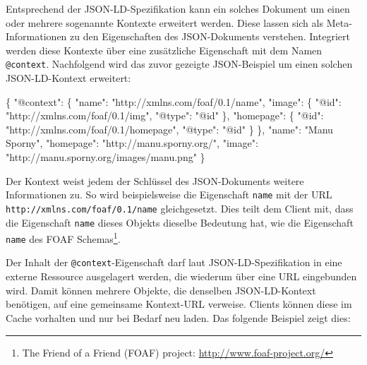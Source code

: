 \documentclass[,a4paper]{article}
\newenvironment{Shaded}{}{}
\newcommand{\DataTypeTok}[1]{\textcolor[rgb]{0.56,0.13,0.00}{{#1}}}
\newcommand{\StringTok}[1]{\textcolor[rgb]{0.25,0.44,0.63}{{#1}}}
\newcommand{\FunctionTok}[1]{\textcolor[rgb]{0.02,0.16,0.49}{{#1}}}
\begin{document}
Entsprechend der JSON-LD-Spezifikation kann ein solches Dokument um
einen oder mehrere sogenannte Kontexte erweitert werden. Diese lassen
sich als Meta-Informationen zu den Eigenschaften des JSON-Dokuments
verstehen. Integriert werden diese Kontexte über eine zusätzliche
Eigenschaft mit dem Namen \texttt{@context}. Nachfolgend wird das zuvor
gezeigte JSON-Beispiel um einen solchen JSON-LD-Kontext erweitert:

\begin{Shaded}
\begin{Highlighting}[]
\FunctionTok{\{}
  \DataTypeTok{"@context"}\FunctionTok{:}
  \FunctionTok{\{}
    \DataTypeTok{"name"}\FunctionTok{:} \StringTok{"http://xmlns.com/foaf/0.1/name"}\FunctionTok{,}
    \DataTypeTok{"image"}\FunctionTok{:} \FunctionTok{\{}
      \DataTypeTok{"@id"}\FunctionTok{:} \StringTok{"http://xmlns.com/foaf/0.1/img"}\FunctionTok{,}
      \DataTypeTok{"@type"}\FunctionTok{:} \StringTok{"@id"}
    \FunctionTok{\},}
    \DataTypeTok{"homepage"}\FunctionTok{:} \FunctionTok{\{}
      \DataTypeTok{"@id"}\FunctionTok{:} \StringTok{"http://xmlns.com/foaf/0.1/homepage"}\FunctionTok{,}
      \DataTypeTok{"@type"}\FunctionTok{:} \StringTok{"@id"}
    \FunctionTok{\}}
  \FunctionTok{\},}
  \DataTypeTok{"name"}\FunctionTok{:} \StringTok{"Manu Sporny"}\FunctionTok{,}
  \DataTypeTok{"homepage"}\FunctionTok{:} \StringTok{"http://manu.sporny.org/"}\FunctionTok{,}
  \DataTypeTok{"image"}\FunctionTok{:} \StringTok{"http://manu.sporny.org/images/manu.png"}
\FunctionTok{\}}
\end{Highlighting}
\end{Shaded}

Der Kontext weist jedem der Schlüssel des JSON-Dokuments weitere
Informationen zu. So wird beispielsweise die Eigenschaft \texttt{name}
mit der URL \texttt{http://xmlns.com/foaf/0.1/name} gleichgesetzt. Dies
teilt dem Client mit, dass die Eigenschaft \texttt{name} dieses Objekts
dieselbe Bedeutung hat, wie die Eigenschaft \texttt{name} des FOAF
Schemas\footnote{The Friend of a Friend (FOAF) project:
  \url{http://www.foaf-project.org/}}.

Der Inhalt der \texttt{@context}-Eigenschaft darf laut
JSON-LD-Spezifikation in eine externe Ressource ausgelagert werden, die
wiederum über eine URL eingebunden wird. Damit können mehrere Objekte,
die denselben JSON-LD-Kontext benötigen, auf eine gemeinsame Kontext-URL
verweise. Clients können diese im Cache vorhalten und nur bei Bedarf neu
laden. Das folgende Beispiel zeigt dies:
\end{document}
